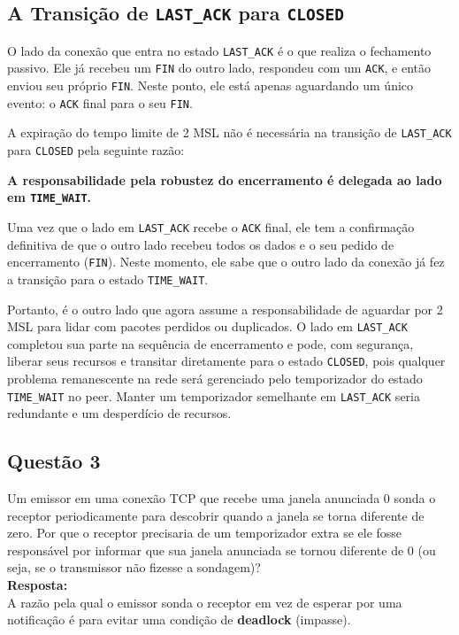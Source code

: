 \subsection*{A Transição de \texttt{LAST\_ACK} para \texttt{CLOSED}}

O lado da conexão que entra no estado \texttt{LAST\_ACK} é o que realiza o fechamento passivo. Ele já recebeu um \texttt{FIN} do outro lado, respondeu com um \texttt{ACK}, e então enviou seu próprio \texttt{FIN}. Neste ponto, ele está apenas aguardando um único evento: o \texttt{ACK} final para o seu \texttt{FIN}.

A expiração do tempo limite de 2 MSL não é necessária na transição de \texttt{LAST\_ACK} para \texttt{CLOSED} pela seguinte razão:

\textbf{A responsabilidade pela robustez do encerramento é delegada ao lado em \texttt{TIME\_WAIT}.}

Uma vez que o lado em \texttt{LAST\_ACK} recebe o \texttt{ACK} final, ele tem a confirmação definitiva de que o outro lado recebeu todos os dados e o seu pedido de encerramento (\texttt{FIN}). Neste momento, ele sabe que o outro lado da conexão já fez a transição para o estado \texttt{TIME\_WAIT}.

Portanto, é o outro lado que agora assume a responsabilidade de aguardar por 2 MSL para lidar com pacotes perdidos ou duplicados. O lado em \texttt{LAST\_ACK} completou sua parte na sequência de encerramento e pode, com segurança, liberar seus recursos e transitar diretamente para o estado \texttt{CLOSED}, pois qualquer problema remanescente na rede será gerenciado pelo temporizador do estado \texttt{TIME\_WAIT} no peer. Manter um temporizador semelhante em \texttt{LAST\_ACK} seria redundante e um desperdício de recursos.



\subsection{Questão 3}
Um emissor em uma conexão TCP que recebe uma janela anunciada 0 sonda o receptor
periodicamente para descobrir quando a janela se torna diferente de zero. Por que o receptor
precisaria de um temporizador extra se ele fosse responsável por informar que sua janela
anunciada se tornou diferente de 0 (ou seja, se o transmissor não fizesse a sondagem)?\\

\noindent
\textbf{Resposta:} \\
A razão pela qual o emissor sonda o receptor em vez de esperar por uma notificação é para evitar uma condição de \textbf{deadlock} (impasse). 

